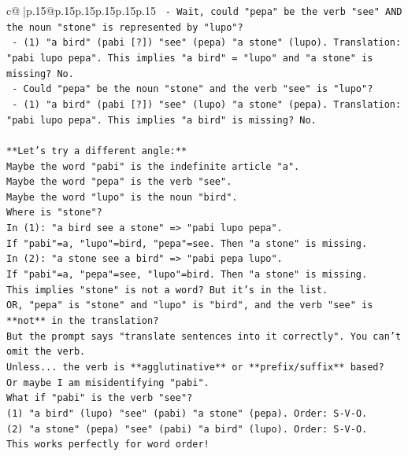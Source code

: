 \documentclass{article}
\begin{document}
{\begin{supertabular}{c@{$\;$}|p{.15\linewidth}@{}p{.15\linewidth}p{.15\linewidth}p{.15\linewidth}p{.15\linewidth}p{.15\linewidth}}
{{{\texttt{      {-} Wait, could "pepa" be the verb "see" AND the noun "stone" is represented by "lupo"?} \\
\texttt{        {-} (1) "a bird" (pabi {[}?{]}) "see" (pepa) "a stone" (lupo). Translation: "pabi lupo pepa". This implies "a bird" = "lupo" and "a stone" is missing? No.} \\
\texttt{      {-} Could "pepa" be the noun "stone" and the verb "see" is "lupo"?} \\
\texttt{        {-} (1) "a bird" (pabi {[}?{]}) "see" (lupo) "a stone" (pepa). Translation: "pabi lupo pepa". This implies "a bird" is missing? No.} \\
\\ 
\texttt{**Let's try a different angle:**} \\
\texttt{Maybe the word "pabi" is the indefinite article "a".} \\
\texttt{Maybe the word "pepa" is the verb "see".} \\
\texttt{Maybe the word "lupo" is the noun "bird".} \\
\texttt{Where is "stone"?} \\
\texttt{In (1): "a bird see a stone" => "pabi lupo pepa".} \\
\texttt{If "pabi"=a, "lupo"=bird, "pepa"=see. Then "a stone" is missing.} \\
\texttt{In (2): "a stone see a bird" => "pabi pepa lupo".} \\
\texttt{If "pabi"=a, "pepa"=see, "lupo"=bird. Then "a stone" is missing.} \\
\texttt{This implies "stone" is not a word? But it's in the list.} \\
\texttt{OR, "pepa" is "stone" and "lupo" is "bird", and the verb "see" is **not** in the translation?} \\
\texttt{But the prompt says "translate sentences into it correctly". You can't omit the verb.} \\
\texttt{Unless... the verb is **agglutinative** or **prefix/suffix** based?} \\
\texttt{Or maybe I am misidentifying "pabi".} \\
\texttt{What if "pabi" is the verb "see"?} \\
\texttt{(1) "a bird" (lupo) "see" (pabi) "a stone" (pepa). Order: S{-}V{-}O.} \\
\texttt{(2) "a stone" (pepa) "see" (pabi) "a bird" (lupo). Order: S{-}V{-}O.} \\
\texttt{This works perfectly for word order!} \\
}}}
\end{supertabular}}
\end{document}
